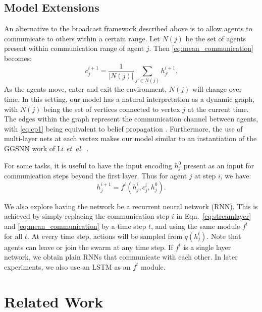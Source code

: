 \documentclass{article}
\def\etal{{\textit{et~al.~}}}
\begin{document}
\subsection{Model Extensions}
\vspace{-2mm}
\label{sec:extra}
  An alternative to the broadcast
framework described above is to allow agents to communicate to others
within a certain range. Let $N(j)$ be the set of agents present within
communication range of agent $j$. Then \eqref{eq:mean_communication} becomes:
\begin{equation} 
c^{i+1}_j = \frac{1}{|N(j)|} \sum_{j'\in N(j)}  h^{i+1}_{j'}.
\label{eq:cp1}
\end{equation}
As the agents move, enter and exit the environment, $N(j)$ will
change over time.  
In this setting, our model has a natural interpretation as a dynamic
graph, with $N(j)$ being the set of vertices connected to vertex $j$
at the current time. The edges within the graph represent the
 communication channel between agents, with \eqref{eq:cp1} being
 equivalent to belief propagation \cite{pearl1982reverend}.
 Furthermore, the use
 of multi-layer nets at each vertex makes our model similar to an 
 instantiation of the GGSNN work of Li \etal \cite{GGSNN}. 

 For some tasks, it is useful to have
the input encoding $h^0_j$ present as an input for communication
steps beyond the first layer. Thus for agent $j$ at step $i$, we have: 
\begin{equation} h^{i+1}_j = f^i(h^{i}_j, c^{i}_j,h^0_j ) \label{eq:skip}.\end{equation}

  We also explore having the network be
a recurrent neural network (RNN). This is achieved by simply replacing
the communication step $i$ in Eqn.~\eqref{eq:streamlayer} and
\eqref{eq:mean_communication} by a time step $t$, and using the same
module $f^t$ for all $t$. At every time step, actions will be sampled
from $q(h^t_j)$. Note that agents can leave or join the swarm at any time step.
If $f^t$ is a single layer network, we obtain plain RNNs that
communicate with each other. In later experiments, we also use an LSTM
as an $f^t$ module. 






\vspace{-2mm}
\section{Related Work}
\vspace{-2mm}
\end{document}
